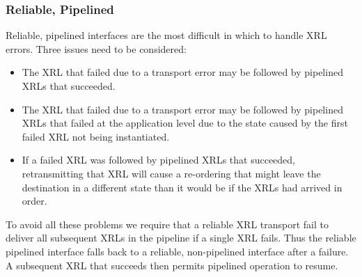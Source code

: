 \documentclass[11pt]{article}
\begin{document}
\subsubsection*{Reliable, Pipelined}

Reliable, pipelined interfaces are the most difficult in which to
handle XRL errors.  Three issues need to be considered:
\begin{itemize}
\item The XRL that failed due to a transport error may be followed by
pipelined XRLs that succeeded.
\item The XRL that failed due to a transport error may be followed by
pipelined XRLs that failed at the application level due to the state
caused by the first failed XRL not being instantiated.
\item If a failed XRL was followed by pipelined XRLs that succeeded,
retransmitting that XRL will cause a re-ordering that might leave the
destination in a different state than it would be if the XRLs had
arrived in order.
\end{itemize}
To avoid all these problems we require that a reliable XRL transport
fail to deliver all subsequent XRLs in the pipeline if a single XRL
fails.  Thus the reliable pipelined interface falls back to a
reliable, non-pipelined interface after a failure.  A subsequent XRL
that succeeds then permits pipelined operation to resume.



\end{document}
